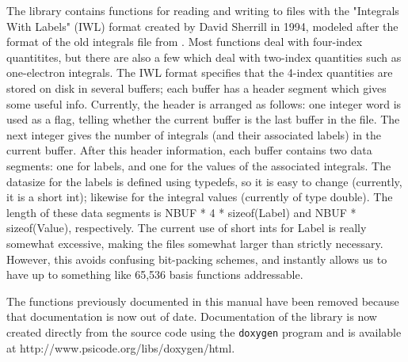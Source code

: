 The library  contains functions for reading and
writing to files with the "Integrals With Labels" (IWL) format created
by David Sherrill in 1994, modeled after the format of the old
integrals file from \PSItwo.  Most functions deal with four-index
quantitites, but there are also a few which deal with two-index
quantities such as one-electron integrals.  The IWL format specifies
that the 4-index quantities are stored on disk in several buffers;
each buffer has a header segment which gives some useful info.
Currently, the header is arranged as follows: one integer word is used
as a flag, telling whether the current buffer is the last buffer in
the file.  The next integer gives the number of integrals (and their
associated labels) in the current buffer.  After this header
information, each buffer contains two data segments: one for labels,
and one for the values of the associated integrals.  The datasize for
the labels is defined using typedefs, so it is easy to change
(currently, it is a short int); likewise for the integral values
(currently of type double).  The length of these data segments is NBUF
* 4 * sizeof(Label) and NBUF * sizeof(Value), respectively.  The
current use of short ints for Label is really somewhat excessive,
making the files somewhat larger than strictly necessary.  However,
this avoids confusing bit-packing schemes, and instantly allows us to
have up to something like 65,536 basis functions addressable.

The functions previously documented in this manual have been removed
because that documentation is now out of date.  Documentation of the
library is now created directly from the source code using the 
{\tt doxygen} program and is available at
{http://www.psicode.org/libs/doxygen/html}.

